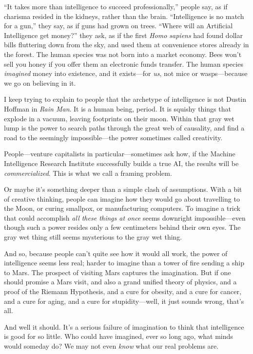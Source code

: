 {
 ``It takes more than intelligence to succeed
professionally,'' people say, as if charisma resided
in the kidneys, rather than the brain. ``Intelligence
is no match for a gun,'' they say, as if guns had
grown on trees. ``Where will an Artificial
Intelligence get money?'' they ask, as if the first
\textit{Homo sapiens} had found dollar bills fluttering down from the
sky, and used them at convenience stores already in the forest. The
human species was not born into a market economy. Bees
won't sell you honey if you offer them an electronic
funds transfer. The human species \textit{imagined} money into
existence, and it exists---for \textit{us}, not mice or wasps---because
we go on believing in it.}

{
 I keep trying to explain to people that the archetype of
intelligence is not Dustin Hoffman in \textit{Rain Man}. It is a human
being, period. It is squishy things that explode in a vacuum, leaving
footprints on their moon. Within that gray wet lump is the power to
search paths through the great web of causality, and find a road to the
seemingly impossible---the power sometimes called creativity.}

{
 People---venture capitalists in particular---sometimes ask how, if
the Machine Intelligence Research Institute successfully builds a true
AI, the results will be \textit{commercialized}. This is what we call a
framing problem.}

{
 Or maybe it's something deeper than a simple clash
of assumptions. With a bit of creative thinking, people can imagine how
they would go about travelling to the Moon, or curing smallpox, or
manufacturing computers. To imagine a trick that could accomplish
\textit{all these things at once} seems downright impossible---even
though such a power resides only a few centimeters behind their own
eyes. The gray wet thing still seems mysterious to the gray wet thing.}

{
 And so, because people can't quite see how it
would all work, the power of intelligence seems less real; harder to
imagine than a tower of fire sending a ship to Mars. The prospect of
visiting Mars captures the imagination. But if one should promise a
Mars visit, and also a grand unified theory of physics, and a proof of
the Riemann Hypothesis, and a cure for obesity, and a cure for cancer,
and a cure for aging, and a cure for stupidity---well, it just sounds
wrong, that's all.}

{
 And well it should. It's a serious failure of
imagination to think that intelligence is good for so little. Who could
have imagined, ever so long ago, what minds would someday do? We may
not even \textit{know} what our real problems are.}

